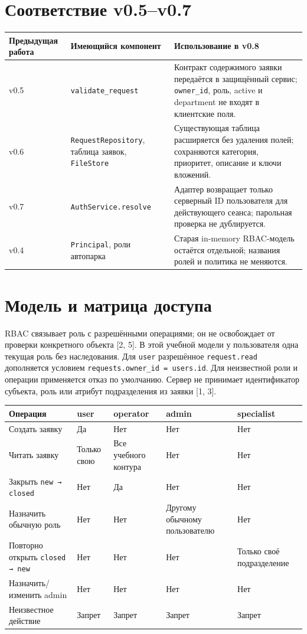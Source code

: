 \documentclass[12pt,a4paper]{article}
\begin{document}
\section{Соответствие v0.5--v0.7}
\begin{longtable}{p{2.1cm}p{5.2cm}p{7.3cm}}
\toprule Предыдущая работа & Имеющийся компонент & Использование в v0.8 \\
\midrule\endhead
v0.5 & \texttt{validate\_request} & Контракт содержимого заявки передаётся в защищённый сервис; \texttt{owner\_id}, роль, active и department не входят в клиентские поля. \\
v0.6 & \texttt{RequestRepository}, таблица заявок, \texttt{FileStore} & Существующая таблица расширяется без удаления полей; сохраняются категория, приоритет, описание и ключи вложений. \\
v0.7 & \texttt{AuthService.resolve} & Адаптер возвращает только серверный ID пользователя для действующего сеанса; парольная проверка не дублируется. \\
v0.4 & \texttt{Principal}, роли автопарка & Старая in-memory RBAC-модель остаётся отдельной; названия ролей и политика не меняются. \\
\bottomrule
\end{longtable}

\section{Модель и матрица доступа}
RBAC связывает роль с разрешёнными операциями; он не освобождает от проверки конкретного объекта [2, 5]. В этой учебной модели у пользователя одна текущая роль без наследования. Для \texttt{user} разрешённое \texttt{request.read} дополняется условием \texttt{requests.owner\_id = users.id}. Для неизвестной роли и операции применяется отказ по умолчанию. Сервер не принимает идентификатор субъекта, роль или атрибут подразделения из заявки [1, 3].

\begin{longtable}{p{5.3cm}p{1.8cm}p{1.8cm}p{1.8cm}p{2.5cm}}
\toprule Операция & user & operator & admin & specialist \\
\midrule\endhead
Создать заявку & Да & Нет & Нет & Нет \\
Читать заявку & Только свою & Все учебного контура & Нет & Нет \\
Закрыть \texttt{new → closed} & Нет & Да & Нет & Нет \\
Назначить обычную роль & Нет & Нет & Другому обычному пользователю & Нет \\
Повторно открыть \texttt{closed → new} & Нет & Нет & Нет & Только своё подразделение \\
Назначить/изменить admin & Нет & Нет & Нет & Нет \\
Неизвестное действие & Запрет & Запрет & Запрет & Запрет \\
\bottomrule
\end{longtable}
\end{document}
